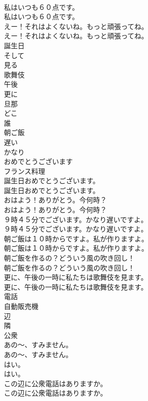 \documentclass[8pt]{extreport}
\begin{document}
\begin{CJK}{UTF8}{min}
\\	私はいつも６０点です。	
\\	私はいつも６０点です。 
\\	えー！それはよくないね。もっと頑張ってね。	
\\	えー！それはよくないね。もっと頑張ってね。 
\\	誕生日
\\	そして
\\	見る
\\	歌舞伎
\\	午後
\\	更に
\\	旦那
\\	どこ
\\	誰
\\	朝ご飯
\\	遅い
\\	かなり
\\	おめでとうございます
\\	フランス料理
\\	誕生日おめでとうございます。	
\\	誕生日おめでとうございます。 
\\	おはよう！ありがとう。今何時？	
\\	おはよう！ありがとう。今何時？ 
\\	９時４５分でございます。かなり遅いですよ。	
\\	９時４５分でございます。かなり遅いですよ。 
\\	朝ご飯は１０時からですよ。私が作りますよ。	
\\	朝ご飯は１０時からですよ。私が作りますよ。 
\\	朝ご飯を作るの？どういう風の吹き回し！	
\\	朝ご飯を作るの？どういう風の吹き回し！ 
\\	更に、午後の一時に私たちは歌舞伎を見ます。	
\\	更に、午後の一時に私たちは歌舞伎を見ます。 
\\	電話
\\	自動販売機
\\	辺
\\	隣
\\	公衆
\\	あの～、すみません。	
\\	あの～、すみません。 
\\	はい。	
\\	はい。 
\\	この辺に公衆電話はありますか。	
\\	この辺に公衆電話はありますか。 

\end{CJK}
\end{document}
